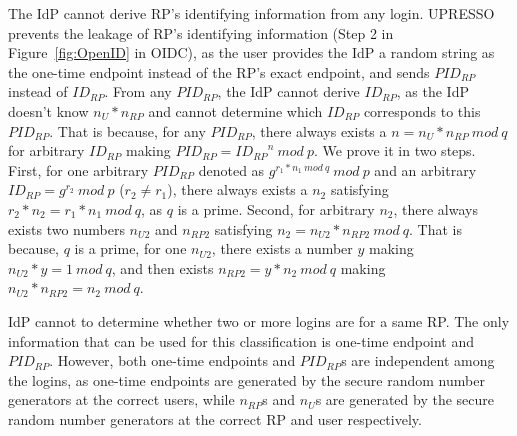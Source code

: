 The IdP cannot derive RP's identifying information from any login.
UPRESSO prevents the leakage of RP's identifying information (Step 2 in Figure~\ref{fig:OpenID} in OIDC), as the user provides the IdP a random string as the one-time endpoint instead of the RP's exact endpoint, and sends $PID_{RP}$ instead of $ID_{RP}$.
From any $PID_{RP}$, the IdP cannot derive $ID_{RP}$, as the IdP doesn't know $n_U*n_{RP}$ and cannot determine which $ID_{RP}$ corresponds to this $PID_{RP}$.
That is because,
for any $PID_{RP}$, there always exists a $n=n_U*n_{RP}\ mod\ q$ for arbitrary $ID_{RP}$ making $PID_{RP}={ID_{RP}}^n \ mod\ p$.
We prove it in two steps.
First, for one arbitrary $PID_{RP}$ denoted  as $g^{r_1*n_1\ mod\ q}\ mod\ p$ and  an arbitrary  $ID_{RP}=g^{r_2}\ mod\ p$ ($r_2 \neq r_1$),  there always exists a $n_2$ satisfying $r_2*n_2=r_1*n_1\ mod\ q$, as $q$ is a prime.
Second, for arbitrary $n_2$, there always exists two numbers $n_{U2}$ and $n_{RP2}$ satisfying $n_2= n_{U2}*n_{RP2}\ mod\ q$.
That is because, $q$ is a prime, for one $n_{U2}$, there exists a number $y$ making $n_{U2}*y=1\ mod\ q$, and then exists $n_{RP2}= y*n_2\ mod\ q$ making $n_{U2}*n_{RP2}=n_2\ mod\ q$.



IdP cannot to determine whether two or more logins are for a same RP. The only information that can be used for this classification is one-time endpoint and $PID_{RP}$. However, both one-time endpoints and $PID_{RP}$s are independent among the logins, as one-time endpoints are generated by the secure random number generators at the correct users, while $n_{RP}$s and $n_{U}$s are generated by the secure random number generators at the correct RP and user respectively.


